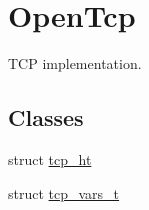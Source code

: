 \hypertarget{group___open_tcp}{}\section{Open\+Tcp}
\label{group___open_tcp}


T\+CP implementation.  


\subsection*{Classes}
\begin{DoxyCompactItemize}
\item 
struct \hyperlink{structtcp__ht}{tcp\+\_\+ht}
\item 
struct \hyperlink{structtcp__vars__t}{tcp\+\_\+vars\+\_\+t}
\end{DoxyCompactItemize}
